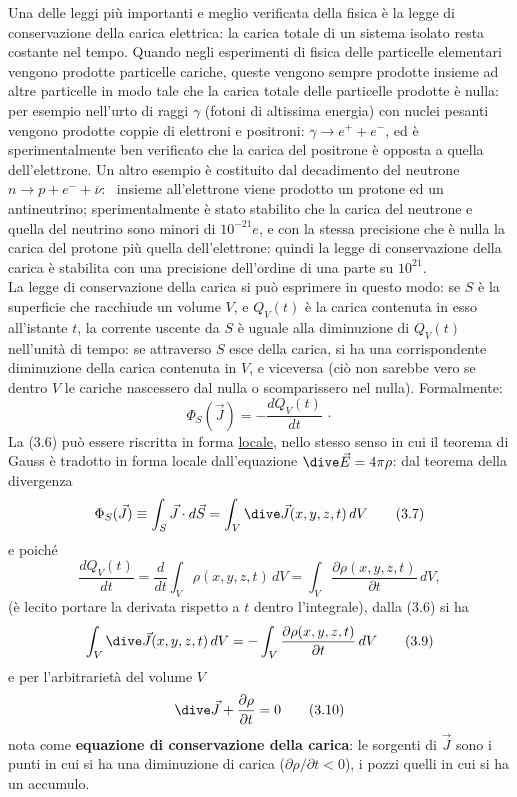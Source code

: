 Una delle leggi pi\`u importanti e meglio verificata della fisica \`e la legge
di conservazione della carica elettrica: la carica totale di un sistema isolato
resta costante nel tempo. Quando negli esperimenti di fisica delle particelle
elementari vengono prodotte particelle cariche, queste vengono sempre prodotte
insieme ad altre particelle in modo tale che la carica totale delle particelle
prodotte \`e nulla: per esempio nell'urto di raggi $\gamma$ (fotoni di altissima
energia) con nuclei pesanti vengono prodotte coppie di elettroni e positroni:
$\gamma\to e^++e^-$, ed \`e sperimentalmente ben verificato che la carica del
positrone \`e opposta a quella dell'elettrone. Un altro esempio \`e costituito
dal decadimento del neutrone \ $n\to p+e^-+\overline\nu$: \ insieme
all'elettrone viene prodotto un protone ed un antineutrino; sperimentalmente \`e
stato stabilito che la carica del neutrone e quella del neutrino sono minori di
$10^{-21}e$, e con la stessa precisione che \`e nulla la carica del protone
pi\`u quella dell'elettrone: quindi la legge di conservazione della carica \`e
stabilita con una precisione dell'ordine di una parte su $10^{21}$.\\
La legge di conservazione della carica si pu\`o esprimere in questo modo: se $S$
\`e la superficie che racchiude un volume $V$, e $Q_V(t)$ \`e la carica
contenuta in esso all'istante $t$, la corrente uscente da $S$ \`e uguale alla
diminuzione di $Q_V(t)$ nell'unit\`a di tempo: se
attraverso $S$ esce della carica, si ha una corrispondente diminuzione della
carica contenuta in $V$, e viceversa (ci\`o non sarebbe vero se dentro $V$ le
cariche nascessero dal nulla o scomparissero nel nulla). Formalmente:
\begin{equation}
  \Phi_S(\vec J)=-\frac{dQ_V(t)}{dt}\,\cdot
  \tag{3.6}
\end{equation}
La (3.6) pu\`o essere riscritta in forma \underline{locale}, nello stesso senso
in cui il teorema di Gauss \`e tradotto in forma locale dall'equazione
$\dive\vec E=4\pi\rho$: dal teorema della divergenza
\begin{equation}
  \Phi_S(\vec J)\equiv\int_S\vec J\cdot d\vec S=\int_V\dive\vec J(x,y,z,t)\,dV
  \tag{3.7}
\end{equation}
e poich\'e
\begin{equation}
  \frac{dQ_V(t)}{dt}=\frac{d}{dt}\int_V\rho(x,y,z,t)\,dV
  =\int_V\frac{\partial\rho(x,y,z,t)}{\partial t}\,dV,
  \tag{3.8}
\end{equation}
(\`e lecito portare la derivata rispetto a $t$ dentro l'integrale), dalla (3.6)
si ha
\begin{equation}
  \int_V\dive\vec J(x,y,z,t)\,dV
  =-\int_V\frac{\partial\rho(x,y,z,t)}{\partial t}\,dV
  \tag{3.9}
\end{equation}
e per l'arbitrariet\`a del volume $V$
\begin{equation}
  \dive\vec J+\frac{\partial\rho}{\partial t}=0
  \tag{3.10}
\end{equation}
nota come \textbf{equazione di conservazione della carica}: le sorgenti di
$\vec J$ sono i punti in cui si ha una diminuzione di carica
($\partial\rho/\partial t<0$), i pozzi quelli in cui si ha un accumulo.

